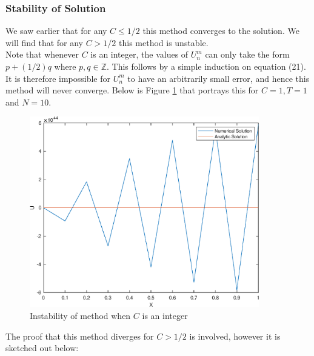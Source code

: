 \documentclass[10pt,a4paper,notitlepage]{article}
\newcommand{\Z}{\mathbb{Z}}
\begin{document}
\subsubsection*{\centering Stability of Solution}\label{subsec:StabSol}
We saw earlier that for any $C\leq1/2$ this method converges to the solution. We will find that for any $C> 1/2$ this method is unstable.\\
Note that whenever $C$ is an integer, the values of $U_{n}^{m}$ can only take the form $p+(1/2)q$ where $p, q\in \Z$. This follows by a simple induction on equation (21). It is therefore impossible for $U_{n}^{m}$ to have an arbitrarily small error, and hence this method will never converge. Below is Figure \ref{fg:Div1} that portrays this for $C=1, T=1$ and $N=10$.
\begin{figure}[H]
\centering
\includegraphics[width=10cm]{Image_3_1Wild}
\caption{Instability of method when $C$ is an integer}
\label{fg:Div1}
\end{figure}

The proof that this method diverges for $C>1/2$ is involved, however it is sketched out below:\\
\end{document}
